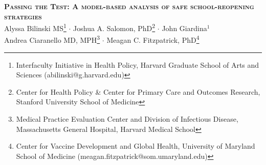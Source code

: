 \documentclass[
]{article}
\author{}
\date{\vspace{-2.5em}}
\begin{document}
\begin{center} 
\textbf{\scshape \LARGE Passing the Test: A model-based analysis of safe school-reopening strategies}\\  \vspace{2mm}
{\large Alyssa Bilinski MS\footnote{Interfaculty Initiative in Health Policy, Harvard Graduate School of Arts and Sciences (abilinski@g.harvard.edu)} $\cdot$ Joshua A. Salomon, PhD\footnote{Center for Health Policy \& Center for Primary Care and Outcomes Research, Stanford University School of Medicine} $\cdot$ John Giardina$^1$ }\\
{\large Andrea Ciaranello MD, MPH\footnote{Medical Practice Evaluation Center and Division of Infectious Disease, Massachusetts General Hospital, Harvard Medical School} $\cdot$ Meagan C. Fitzpatrick, PhD\footnote{Center for Vaccine Development and Global Health, University of Maryland School of Medicine (meagan.fitzpatrick@som.umaryland.edu)}} \\
\end{center}

\vspace{-0.50em}
\bigskip
\end{document}
